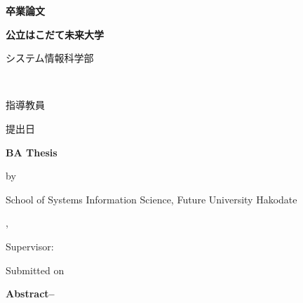 \documentclass[uplatex, a4paper, report, 11pt, oneside]{jsbook}
\begin{document}
\thispagestyle{empty}
\vspace*{4truemm}
\begin{center}
    \LARGE\bfseries
    卒業論文
\end{center}
\vspace*{2truemm}
\begin{center}
    \LARGE\bfseries\jtitle
\end{center}
\vspace*{1em}
\begin{center}
    \large\bfseries 公立はこだて未来大学\par%
    システム情報科学部~~\jdepartment\par%
    \jcourse~~\studentID
\end{center}
\vspace*{1em}
\begin{center}
    \Large\bfseries\jauthor
\end{center}
\vspace*{1em}
\begin{center}
    \large 指導教員~~~~\jadvisor\par
    \vspace{0.5em}
    \large 提出日~~~~\jdate
\end{center}
\vspace*{3em}
\begin{center}
\textbf{\Large BA Thesis}\par
\vspace*{2em}
\textbf{\Large \etitle}\par
\vspace*{1em}
{\normalsize by}\par
\vspace*{1em}
{\large \eauthor}\par
\vspace*{1.5em}
School of Systems Information Science, Future University Hakodate \par
\ecourse, \edepartment

\normalsize Supervisor: \quad \eadvisor \par
\vspace*{2em}
Submitted on \edate
\end{center}
\vspace*{\fill}

\newpage
\thispagestyle{empty}
\noindent
\textbf{Abstract--}~
\eabstract
\end{document}
